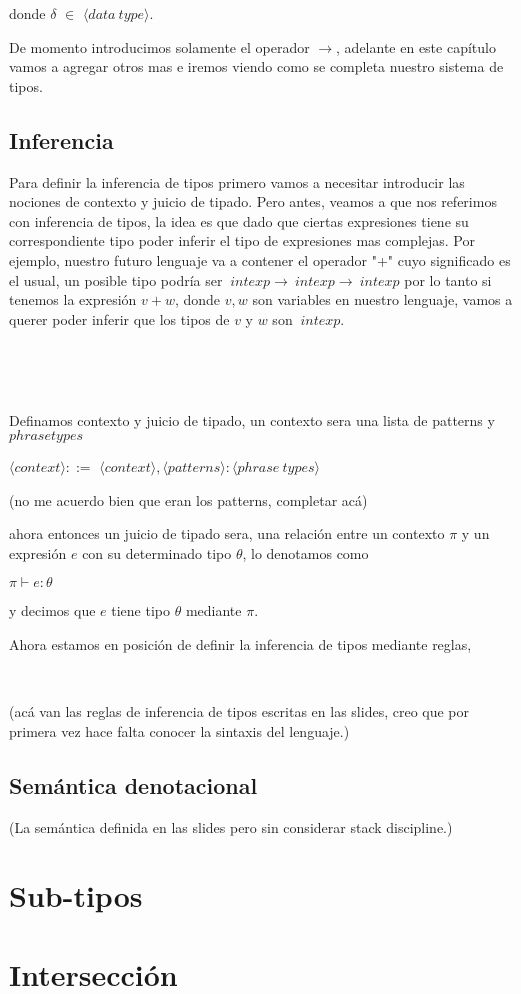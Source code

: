 donde $\delta$ $\in$ $\langle data \ type \rangle$.

De momento introducimos solamente el operador $\rightarrow$, adelante en este 
cap\'itulo vamos a agregar otros mas e iremos viendo como se completa nuestro
sistema de tipos.\

\subsection{Inferencia}
Para definir la inferencia de tipos primero vamos a necesitar introducir las 
nociones de contexto y juicio de tipado. Pero antes, veamos a que nos referimos
con inferencia de tipos, la idea es que dado que ciertas expresiones tiene 
su correspondiente tipo poder inferir el tipo de expresiones mas complejas.
Por ejemplo, nuestro futuro lenguaje va a contener el operador "+" cuyo significado
es el usual, un posible tipo podr\'ia ser ${\ intexp} \rightarrow {\ intexp} \rightarrow {\ intexp}$
por lo tanto si tenemos la expresi\'on $v + w$, donde $v,w$ son variables en
nuestro lenguaje, vamos a querer poder inferir que los tipos de $v$ y $w$ son
${\ intexp}$.\

\

\

\noindent Definamos contexto y juicio de tipado, un contexto sera una lista de 
patterns y $phrase types$

\begin{center} 

$\langle context \rangle ::=$ 
		$\langle context \rangle , \langle patterns \rangle:\langle phrase \ types \rangle$

\end{center}
(no me acuerdo bien que eran los patterns, completar ac\'a)

ahora entonces un juicio de tipado sera, una relaci\'on entre un contexto $\pi$ y un expresi\'on $e$
con su determinado tipo $\theta$, lo denotamos como

\begin{center} $\pi \vdash e : \theta$ \end{center}

y decimos que $e$ tiene tipo $\theta$ mediante $\pi$.\

Ahora estamos en posici\'on de definir la inferencia de tipos mediante reglas,

\

(ac\'a van las reglas de inferencia de tipos escritas en las slides, creo que por primera vez
hace falta conocer la sintaxis del lenguaje.)

\subsection{Sem\'antica denotacional}

(La sem\'antica definida en las slides pero sin considerar stack discipline.)


\section{Sub-tipos}

\section{Intersecci\'on}
